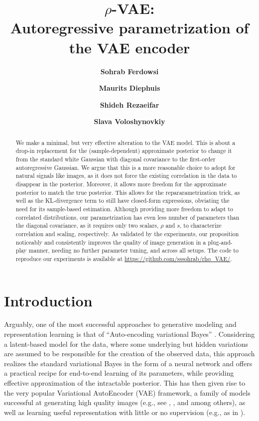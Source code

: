\documentclass{article}
\title{$\rho$-VAE: \\Autoregressive parametrization of the VAE encoder}
\author{\textbf{Sohrab Ferdowsi}}
\author{\textbf{Maurits Diephuis}}
\author{\textbf{Shideh Rezaeifar}}
\author{\textbf{Slava Voloshynovkiy}}
\affil{
Department of Computer Science, University of Geneva, Switzerland \authorcr
  \{\tt sohrab.ferdowsi, maurits.diephuis, shideh.rezaeifar, svolos\}@unige.ch}
\begin{document}
\maketitle

\begin{abstract}


 
We make a minimal, but very effective alteration to the VAE model. This is about a drop-in replacement for the (sample-dependent) approximate posterior to change it from the standard white Gaussian with diagonal covariance to the first-order autoregressive Gaussian. We argue that this is a more reasonable choice to adopt for natural signals like images, as it does not force the existing correlation in the data to disappear in the posterior. Moreover, it allows more freedom for the approximate posterior to match the true posterior. This allows for the repararametrization trick, as well as the KL-divergence term to still have closed-form expressions, obviating the need for its sample-based estimation. Although providing more freedom to adapt to correlated distributions, our parametrization has even less number of parameters than the diagonal covariance, as it requires only two scalars, $\rho$ and $s$, to characterize correlation and scaling, respectively. As validated by the experiments, our proposition noticeably and consistently improves the quality of image generation in a plug-and-play manner, needing no further parameter tuning, and across all setups. The code to reproduce our experiments is available at \url{https://github.com/sssohrab/rho_VAE/}.
 
\end{abstract}

\section{Introduction}
Arguably, one of the most successful approaches to generative modeling and representation learning is that of ``Auto-encoding variational Bayes'' \cite{VAE}. Considering a latent-based model for the data, where some underlying but hidden variations are assumed to be responsible for the creation of the observed data, this approach realizes the standard variational Bayes in the form of a neural network and offers a practical recipe for end-to-end learning of its parameters, while providing effective approximation of the intractable posterior. This has then given rise to the very popular Variational AutoEncoder (VAE) framework, a family of models successful at generating high quality images (e.g., see \cite{dai2019diagnosing}, \cite{rezende14} , \cite{LossyVAE} and \cite{PixelVAE} among others), as well as learning useful representation with little or no supervision (e.g., as in \cite{kingma2014semi}).
\end{document}
